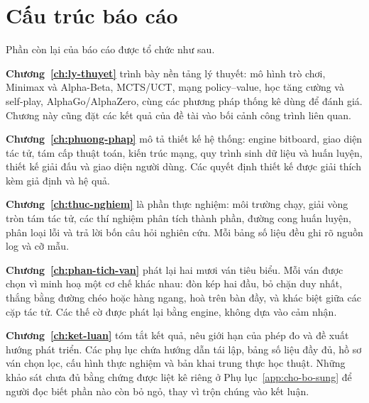 \section{Cấu trúc báo cáo}
\label{sec:gt-cau-truc}
Phần còn lại của báo cáo được tổ chức như sau.

\textbf{Chương~\ref{ch:ly-thuyet}} trình bày nền tảng lý thuyết: mô hình trò chơi, Minimax và
Alpha-Beta, MCTS/UCT, mạng policy--value, học tăng cường và self-play, AlphaGo/AlphaZero, cùng
các phương pháp thống kê dùng để đánh giá. Chương này cũng đặt các kết quả của đề tài vào bối
cảnh công trình liên quan.

\textbf{Chương~\ref{ch:phuong-phap}} mô tả thiết kế hệ thống: engine bitboard, giao diện tác tử,
tám cấp thuật toán, kiến trúc mạng, quy trình sinh dữ liệu và huấn luyện, thiết kế giải đấu và
giao diện người dùng. Các quyết định thiết kế được giải thích kèm giả định và hệ quả.

\textbf{Chương~\ref{ch:thuc-nghiem}} là phần thực nghiệm: môi trường chạy, giải vòng tròn tám
tác tử, các thí nghiệm phân tích thành phần, đường cong huấn luyện, phân loại lỗi và trả lời
bốn câu hỏi nghiên cứu. Mỗi bảng số liệu đều ghi rõ nguồn log và cỡ mẫu.

\textbf{Chương~\ref{ch:phan-tich-van}} phát lại hai mươi ván tiêu biểu. Mỗi ván được chọn vì
minh hoạ một cơ chế khác nhau: đòn kép hai đầu, bỏ chặn duy nhất, thắng bằng đường chéo hoặc
hàng ngang, hoà trên bàn đầy, và khác biệt giữa các cặp tác tử. Các thế cờ được phát lại bằng
engine, không dựa vào cảm nhận.

\textbf{Chương~\ref{ch:ket-luan}} tóm tắt kết quả, nêu giới hạn của phép đo và đề xuất hướng
phát triển. Các phụ lục chứa hướng dẫn tái lập, bảng số liệu đầy đủ, hồ sơ ván chọn lọc, cấu
hình thực nghiệm và bản khai trung thực học thuật. Những khảo sát chưa đủ bằng chứng được liệt
kê riêng ở Phụ lục~\ref{app:cho-bo-sung} để người đọc biết phần nào còn bỏ ngỏ, thay vì trộn
chúng vào kết luận.
